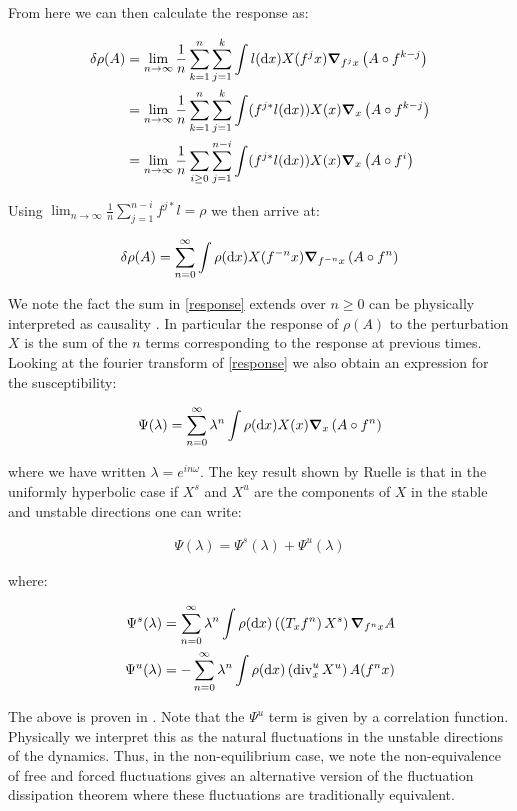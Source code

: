 \noindent From here we can then calculate the response as:

\begin{align}
\delta \rho (A) &= \lim_{n \to \infty} \frac{1}{n} \sum_{k = 1}^n \sum_{j=1}^k \int l (\dd x) X(f^j x) \grad_{f^j x} \left(A \circ f ^{k -j} \right)\\
&= \lim_{n \to \infty} \frac{1}{n} \sum_{k = 1}^n \sum_{j=1}^k \int (f^{j*} l (\dd x )) X(x) \grad_{x} \left(A \circ f ^{k -j} \right)\\ 
&= \lim_{n \to \infty} \frac{1}{n} \sum_{i \geq 0} \sum_{j=1}^{n-i} \int (f^{j*} l (\dd x )) X(x) \grad_{x} \left(A \circ f ^i \right)
\end{align}

\noindent Using $\lim_{n \to \infty} \frac{1}{n} \sum_{j=1}^{n-i} f^{j*} l = \rho$ we then arrive at:

\begin{align}
\delta \rho (A) = \sum_{n =0}^\infty \int \rho (\dd x) X(f^{-n}x) \grad_{f^{-n}x}\left(A \circ f^n \right) \label{response}
\end{align}

\noindent We note the fact the sum in \ref{response} extends over $n \geq 0$ can be physically interpreted as causality \cite{Ruelle}. In particular the response of $\rho(A)$ to the perturbation $X$ is the sum of the $n$ terms corresponding to the response at previous times. Looking at the fourier transform of \ref{response} we also obtain an expression for the susceptibility:

\begin{align}
\Psi(\lambda) = \sum_{n=0}^\infty \lambda ^n \int \rho (\dd x) X(x) \grad_x \left(A \circ f^n \right)
\end{align}

\noindent where we have written $\lambda = e^{in\omega}$. The key result shown by Ruelle is that in the uniformly hyperbolic case if $X^s$ and $X^u$ are the components of $X$ in  the stable and unstable directions one can write:

\begin{align}
\Psi(\lambda) = \Psi ^s(\lambda) + \Psi ^u (\lambda)
\end{align}

\noindent where:

\begin{align}
\Psi^s(\lambda) &= \sum_{n=0}^\infty \lambda^n \int \rho(\dd x) \left( \left(T_x f^n \right) X^s \right) \grad_{f^n x} A \\
\Psi^u(\lambda) &= - \sum_{n=0}^\infty \lambda^n \int \rho(\dd x) \left( \operatorname{div}_x^u X^u \right) A(f^n x)
\end{align}

\noindent The above is proven in \cite{Ruelle1997}. Note that the $\Psi^u$ term is given by a correlation function. Physically we interpret this as the natural fluctuations in the unstable directions of the dynamics. Thus, in the non-equilibrium case, we note the non-equivalence of free and forced fluctuations gives an alternative version of the fluctuation dissipation theorem where these fluctuations are traditionally equivalent.
